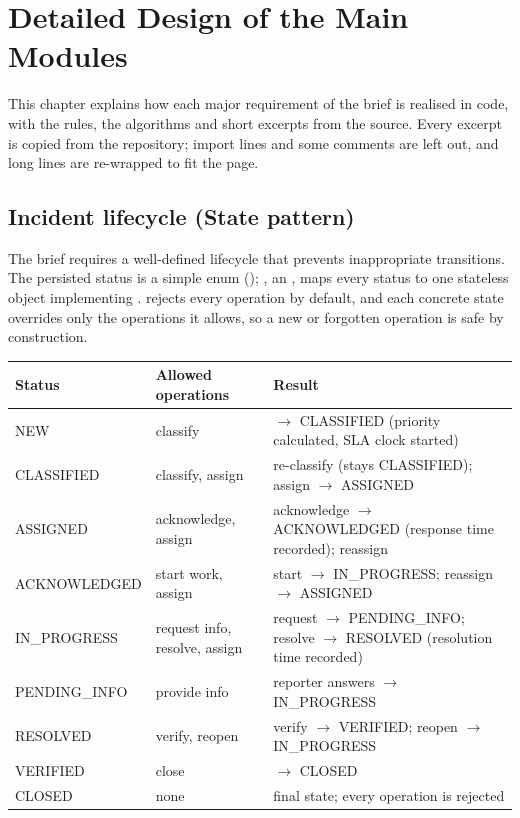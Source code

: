 \section{Detailed Design of the Main Modules}
This chapter explains how each major requirement of the brief is realised in code, with the rules, the algorithms and short excerpts from the source. Every excerpt is copied from the repository; import lines and some comments are left out, and long lines are re-wrapped to fit the page.

\subsection{Incident lifecycle (State pattern)}
The brief requires a well-defined lifecycle that prevents inappropriate transitions. The persisted status is a simple enum (); , an , maps every status to one stateless object implementing .  rejects every operation by default, and each concrete state overrides only the operations it allows, so a new or forgotten operation is safe by construction.

\begin{longtable}{@{}L{2.9cm}L{4.4cm}L{7.9cm}@{}}
\toprule
\textbf{Status} & \textbf{Allowed operations} & \textbf{Result} \\
\midrule\endhead
NEW & classify & $\rightarrow$ CLASSIFIED (priority calculated, SLA clock started) \\
CLASSIFIED & classify, assign & re-classify (stays CLASSIFIED); assign $\rightarrow$ ASSIGNED \\
ASSIGNED & acknowledge, assign & acknowledge $\rightarrow$ ACKNOWLEDGED (response time recorded); reassign \\
ACKNOWLEDGED & start work, assign & start $\rightarrow$ IN\_PROGRESS; reassign $\rightarrow$ ASSIGNED \\
IN\_PROGRESS & request info, resolve, assign & request $\rightarrow$ PENDING\_INFO; resolve $\rightarrow$ RESOLVED (resolution time recorded) \\
PENDING\_INFO & provide info & reporter answers $\rightarrow$ IN\_PROGRESS \\
RESOLVED & verify, reopen & verify $\rightarrow$ VERIFIED; reopen $\rightarrow$ IN\_PROGRESS \\
VERIFIED & close & $\rightarrow$ CLOSED \\
CLOSED & none & final state; every operation is rejected \\
\bottomrule
\end{longtable}

